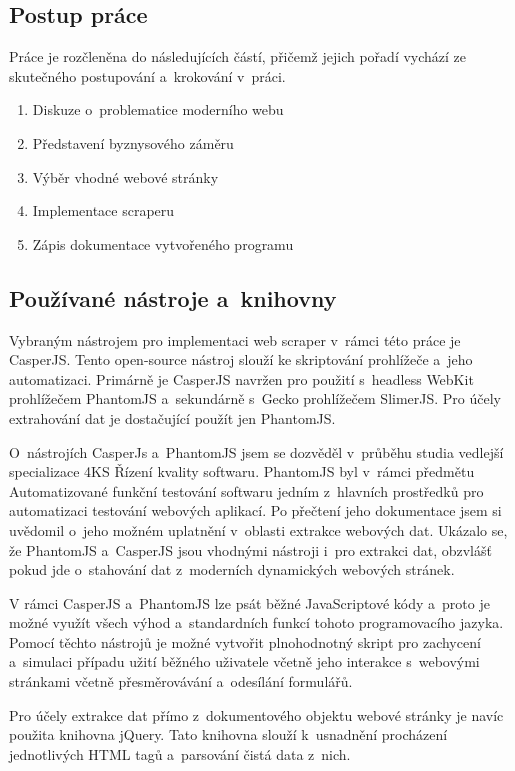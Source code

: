 \documentclass[11pt,a4paper]{article}
\begin{document}
\subsection{Postup práce}
Práce je rozčleněna do následujících částí, přičemž jejich pořadí vychází ze skutečného postupování a~krokování v~práci.
\begin{enumerate}
\item Diskuze o~problematice moderního webu
\item Představení byznysového záměru
\item Výběr vhodné webové stránky
\item Implementace scraperu
\item Zápis dokumentace vytvořeného programu
\end{enumerate}

\subsection{Používané nástroje a~knihovny}
Vybraným nástrojem pro implementaci web scraper v~rámci této práce je CasperJS. Tento open-source nástroj slouží ke skriptování prohlížeče a~jeho automatizaci. Primárně je CasperJS navržen pro použití s~headless WebKit prohlížečem PhantomJS a~sekundárně s~Gecko prohlížečem SlimerJS. Pro účely extrahování dat je dostačující použít jen PhantomJS.

O~nástrojích CasperJs a~PhantomJS jsem se dozvěděl v~průběhu studia vedlejší specializace 4KS Řízení kvality softwaru. PhantomJS byl v~rámci předmětu Automatizované funkční testování softwaru jedním z~hlavních prostředků pro automatizaci testování webových aplikací. Po přečtení jeho dokumentace jsem si uvědomil o~jeho možném uplatnění v~oblasti extrakce webových dat. Ukázalo se, že PhantomJS a~CasperJS jsou vhodnými nástroji i~pro extrakci dat, obzvlášť pokud jde o~stahování dat z~moderních dynamických webových stránek.

V rámci CasperJS a~PhantomJS lze psát běžné JavaScriptové kódy a~proto je možné využít všech výhod a~standardních funkcí tohoto programovacího jazyka. Pomocí těchto nástrojů je možné vytvořit plnohodnotný skript pro zachycení a~simulaci případu užití běžného uživatele včetně jeho interakce s~webovými stránkami včetně přesměrovávání a~odesílání formulářů.

Pro účely extrakce dat přímo z~dokumentového objektu webové stránky je navíc použita knihovna jQuery. Tato knihovna slouží k~usnadnění procházení jednotlivých HTML tagů a~parsování čistá data z~nich.
\end{document}
